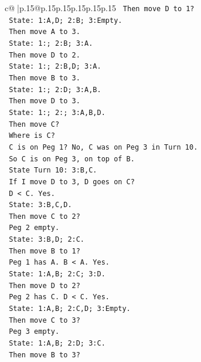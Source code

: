 \documentclass{article}
\begin{document}
{\begin{supertabular}{c@{$\;$}|p{.15\linewidth}@{}p{.15\linewidth}p{.15\linewidth}p{.15\linewidth}p{.15\linewidth}p{.15\linewidth}}
{{{\texttt{            Then move D to 1?} \\
\texttt{            State: 1:A,D; 2:B; 3:Empty.} \\
\texttt{            Then move A to 3.} \\
\texttt{            State: 1:; 2:B; 3:A.} \\
\texttt{            Then move D to 2.} \\
\texttt{            State: 1:; 2:B,D; 3:A.} \\
\texttt{            Then move B to 3.} \\
\texttt{            State: 1:; 2:D; 3:A,B.} \\
\texttt{            Then move D to 3.} \\
\texttt{            State: 1:; 2:; 3:A,B,D.} \\
\texttt{            Then move C?} \\
\texttt{            Where is C?} \\
\texttt{            C is on Peg 1? No, C was on Peg 3 in Turn 10.} \\
\texttt{            So C is on Peg 3, on top of B.} \\
\texttt{            State Turn 10: 3:B,C.} \\
\texttt{            If I move D to 3, D goes on C?} \\
\texttt{            D < C. Yes.} \\
\texttt{            State: 3:B,C,D.} \\
\texttt{            Then move C to 2?} \\
\texttt{            Peg 2 empty.} \\
\texttt{            State: 3:B,D; 2:C.} \\
\texttt{            Then move B to 1?} \\
\texttt{            Peg 1 has A. B < A. Yes.} \\
\texttt{            State: 1:A,B; 2:C; 3:D.} \\
\texttt{            Then move D to 2?} \\
\texttt{            Peg 2 has C. D < C. Yes.} \\
\texttt{            State: 1:A,B; 2:C,D; 3:Empty.} \\
\texttt{            Then move C to 3?} \\
\texttt{            Peg 3 empty.} \\
\texttt{            State: 1:A,B; 2:D; 3:C.} \\
\texttt{            Then move B to 3?} \\
}}}
\end{supertabular}}
\end{document}
